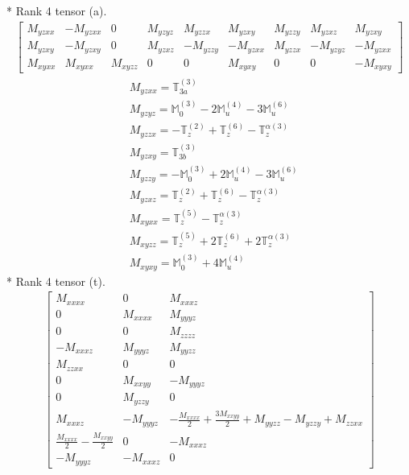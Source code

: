 \documentclass[fleqn,8pt,landscape]{jsarticle}
\begin{document}
* Rank 4 tensor (a).
\begin{align*}
\begin{bmatrix} M_{yzxx} & - M_{yzxx} & 0 & M_{yzyz} & M_{yzzx} & M_{yzxy} & M_{yzzy} & M_{yzxz} & M_{yzxy} \\ M_{yzxy} & - M_{yzxy} & 0 & M_{yzxz} & - M_{yzzy} & - M_{yzxx} & M_{yzzx} & - M_{yzyz} & - M_{yzxx} \\ M_{xyxx} & M_{xyxx} & M_{xyzz} & 0 & 0 & M_{xyxy} & 0 & 0 & - M_{xyxy} \end{bmatrix}
\end{align*}
\begin{align*}
& M_{yzxx} = \mathbb{T}_{3a}^{(3)} \\
& M_{yzyz} = \mathbb{M}_{0}^{(3)} - 2 \mathbb{M}_{u}^{(4)} - 3 \mathbb{M}_{u}^{(6)} \\
& M_{yzzx} = - \mathbb{T}_{z}^{(2)} + \mathbb{T}_{z}^{(6)} - \mathbb{T}_{z}^{\alpha(3)} \\
& M_{yzxy} = \mathbb{T}_{3b}^{(3)} \\
& M_{yzzy} = - \mathbb{M}_{0}^{(3)} + 2 \mathbb{M}_{u}^{(4)} - 3 \mathbb{M}_{u}^{(6)} \\
& M_{yzxz} = \mathbb{T}_{z}^{(2)} + \mathbb{T}_{z}^{(6)} - \mathbb{T}_{z}^{\alpha(3)} \\
& M_{xyxx} = \mathbb{T}_{z}^{(5)} - \mathbb{T}_{z}^{\alpha(3)} \\
& M_{xyzz} = \mathbb{T}_{z}^{(5)} + 2 \mathbb{T}_{z}^{(6)} + 2 \mathbb{T}_{z}^{\alpha(3)} \\
& M_{xyxy} = \mathbb{M}_{0}^{(3)} + 4 \mathbb{M}_{u}^{(4)}
\end{align*}
* Rank 4 tensor (t).
\begin{align*}
\begin{bmatrix} M_{xxxx} & 0 & M_{xxxz} \\ 0 & M_{xxxx} & M_{yyyz} \\ 0 & 0 & M_{zzzz} \\ - M_{xxxz} & M_{yyyz} & M_{yyzz} \\ M_{zzxx} & 0 & 0 \\ 0 & M_{xxyy} & - M_{yyyz} \\ 0 & M_{yzzy} & 0 \\ M_{xxxz} & - M_{yyyz} & - \frac{M_{xxxx}}{2} + \frac{3 M_{xxyy}}{2} + M_{yyzz} - M_{yzzy} + M_{zzxx} \\ \frac{M_{xxxx}}{2} - \frac{M_{xxyy}}{2} & 0 & - M_{xxxz} \\ - M_{yyyz} & - M_{xxxz} & 0 \end{bmatrix}
\end{align*}
\end{document}
